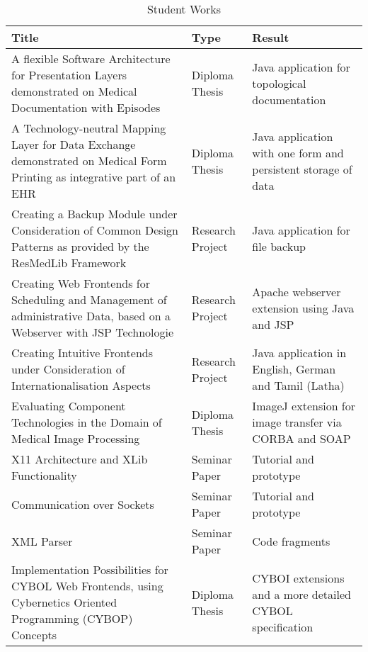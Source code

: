 \begin{table}[ht]
    \begin{center}
        \begin{footnotesize}
        \begin{tabular}{| p{60mm} | p{10mm} | p{35mm} |}
            \hline
            \textbf{Title} & \textbf{Type} & \textbf{Result}\\
            \hline
            A flexible Software Architecture for Presentation Layers demonstrated
            on Medical Documentation with Episodes \cite{bohl}
            & Diploma Thesis & Java application for topological documentation\\
            \hline
            A Technology-neutral Mapping Layer for Data Exchange demonstrated
            on Medical Form Printing as integrative part of an EHR \cite{kunze2003}
            & Diploma Thesis & Java application with one form and persistent storage of data\\
            \hline
            Creating a Backup Module under Consideration of Common Design Patterns
            as provided by the ResMedLib Framework \cite{behrendt}
            & Research Project & Java application for file backup\\
            \hline
            Creating Web Frontends for Scheduling and Management of administrative
            Data, based on a Webserver with JSP Technologie \cite{holzmueller2003}
            & Research Project & Apache webserver extension using Java and JSP\\
            \hline
            Creating Intuitive Frontends under Consideration of
            Internationalisation Aspects \cite{kanagasabapathi}
            & Research Project & Java application in English, German and Tamil (Latha)\\
            \hline
            Evaluating Component Technologies in the Domain of Medical Image Processing \cite{kleinschmidt}
            & Diploma Thesis & ImageJ extension for image transfer via CORBA and SOAP\\
            \hline
            X11 Architecture and XLib Functionality \cite{fache}
            & Seminar Paper & Tutorial and prototype\\
            \hline
            Communication over Sockets \cite{kiesling}
            & Seminar Paper & Tutorial and prototype\\
            \hline
            XML Parser \cite{tellhelm}
            & Seminar Paper & Code fragments\\
            \hline
            Implementation Possibilities for CYBOL Web Frontends, using
            Cybernetics Oriented Programming (CYBOP) Concepts \cite{holzmueller2005}
            & Diploma Thesis & CYBOI extensions and a more detailed CYBOL specification\\
            \hline
        \end{tabular}
        \end{footnotesize}
        \caption{Student Works \cite{cybop}}
        \label{works_table}
    \end{center}
\end{table}
